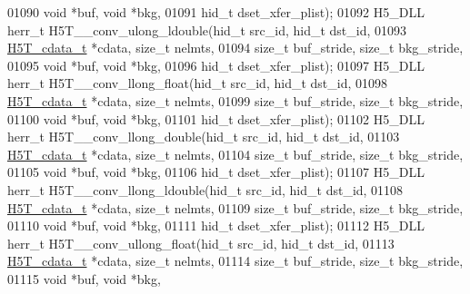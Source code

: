 \begin{DoxyCode}
01090                                      \textcolor{keywordtype}{void} *buf, \textcolor{keywordtype}{void} *bkg,
01091                                      hid\_t dset\_xfer\_plist);
01092 H5\_DLL herr\_t H5T\_\_conv\_ulong\_ldouble(hid\_t src\_id, hid\_t dst\_id,
01093                      \hyperlink{struct_h5_t__cdata__t}{H5T\_cdata\_t} *cdata, \textcolor{keywordtype}{size\_t} nelmts,
01094                      \textcolor{keywordtype}{size\_t} buf\_stride, \textcolor{keywordtype}{size\_t} bkg\_stride,
01095                                      \textcolor{keywordtype}{void} *buf, \textcolor{keywordtype}{void} *bkg,
01096                                      hid\_t dset\_xfer\_plist);
01097 H5\_DLL herr\_t H5T\_\_conv\_llong\_float(hid\_t src\_id, hid\_t dst\_id,
01098                      \hyperlink{struct_h5_t__cdata__t}{H5T\_cdata\_t} *cdata, \textcolor{keywordtype}{size\_t} nelmts,
01099                      \textcolor{keywordtype}{size\_t} buf\_stride, \textcolor{keywordtype}{size\_t} bkg\_stride,
01100                                      \textcolor{keywordtype}{void} *buf, \textcolor{keywordtype}{void} *bkg,
01101                                      hid\_t dset\_xfer\_plist);
01102 H5\_DLL herr\_t H5T\_\_conv\_llong\_double(hid\_t src\_id, hid\_t dst\_id,
01103                      \hyperlink{struct_h5_t__cdata__t}{H5T\_cdata\_t} *cdata, \textcolor{keywordtype}{size\_t} nelmts,
01104                      \textcolor{keywordtype}{size\_t} buf\_stride, \textcolor{keywordtype}{size\_t} bkg\_stride,
01105                                      \textcolor{keywordtype}{void} *buf, \textcolor{keywordtype}{void} *bkg,
01106                                      hid\_t dset\_xfer\_plist);
01107 H5\_DLL herr\_t H5T\_\_conv\_llong\_ldouble(hid\_t src\_id, hid\_t dst\_id,
01108                      \hyperlink{struct_h5_t__cdata__t}{H5T\_cdata\_t} *cdata, \textcolor{keywordtype}{size\_t} nelmts,
01109                      \textcolor{keywordtype}{size\_t} buf\_stride, \textcolor{keywordtype}{size\_t} bkg\_stride,
01110                                      \textcolor{keywordtype}{void} *buf, \textcolor{keywordtype}{void} *bkg,
01111                                      hid\_t dset\_xfer\_plist);
01112 H5\_DLL herr\_t H5T\_\_conv\_ullong\_float(hid\_t src\_id, hid\_t dst\_id,
01113                      \hyperlink{struct_h5_t__cdata__t}{H5T\_cdata\_t} *cdata, \textcolor{keywordtype}{size\_t} nelmts,
01114                      \textcolor{keywordtype}{size\_t} buf\_stride, \textcolor{keywordtype}{size\_t} bkg\_stride,
01115                                      \textcolor{keywordtype}{void} *buf, \textcolor{keywordtype}{void} *bkg,

\end{DoxyCode}
